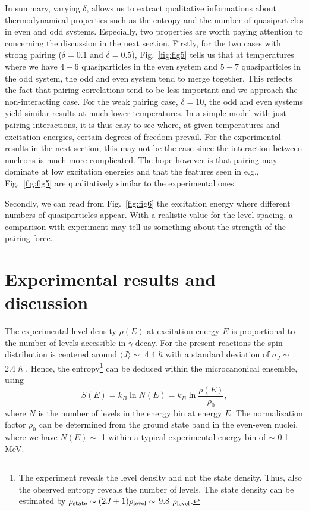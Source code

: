 In summary, varying $\delta$, allows us to extract qualitative informations about thermodynamical properties such as the entropy and the number of quasiparticles in even and odd systems. Especially, two properties are worth paying attention to concerning the discussion in the next section. Firstly, for the two cases with strong pairing ($\delta=0.1$ and $\delta=0.5$), Fig.\ \ref{fig:fig5} tells us that at temperatures where we have  $4-6$ quasiparticles in the even system and $5-7$  quasiparticles in the odd system, the odd and even system tend to merge together. This reflects the fact that pairing correlations tend to be less important and we approach the non-interacting case.  For the weak pairing case, $\delta=10$, the odd and even systems yield similar results at much lower temperatures. In a simple model with just pairing interactions, it is thus easy to see where, at given temperatures and excitation energies, certain degrees of freedom prevail. For the experimental results in the next section, this may not be the case since the interaction between nucleons is much more complicated. The hope however is that pairing may dominate at low excitation energies and that the features seen in e.g., Fig.\ \ref{fig:fig5} are qualitatively similar to the experimental ones.

Secondly, we can read from Fig.\ \ref{fig:fig6} the excitation energy where different numbers of quasiparticles appear. With a realistic value for the level spacing, a comparison with experiment may tell us something about the strength of the pairing force. 

\section{Experimental results and discussion}

The experimental level density $\rho(E)$ at excitation energy $E$ is proportional to the number of levels accessible in $\gamma$-decay. For the present reactions the spin distribution is centered around $\langle J\rangle \sim$ 4.4 $\hbar$ with a standard deviation of $\sigma_J \sim$ 2.4 $\hbar$ \cite{spindis}. Hence, the entropy\footnote{The experiment reveals the level density and not the state density. Thus, also the observed entropy reveals the number of levels. The state density can be estimated by $\rho_{\rm state} \sim (2J+1)\rho_{\rm level} \sim$ 9.8 $\rho_{\rm level}$.} can be deduced within the microcanonical ensemble, using 
\begin{equation}
S(E) = k_B \ln N(E) = k_B \ln \frac{\rho(E)}{\rho_0},
\end{equation}
where $N$ is the number of levels in the energy bin at energy $E$. The normalization factor $\rho_0$ can be determined from the ground state band in the even-even nuclei, where we have $N(E) \sim$ 1 within a typical experimental energy bin of $\sim$ 0.1 MeV. 

